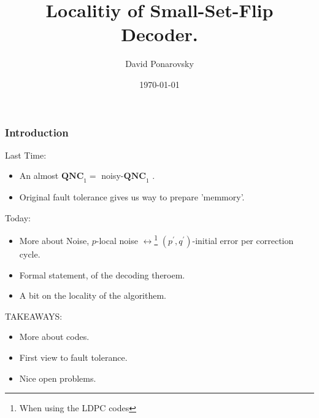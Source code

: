 \documentclass{beamer}
\newcommand*{\QNCon}{ \mathbf{QNC}_{1} }
\newcommand*{\noiseQNCon}{ noisy-$\QNCon$ }
\begin{document}
 

\newcommand*{\Tr}{\textbf{Tr }}


\begin{frame}
  \title{ Localitiy of Small-Set-Flip Decoder.  }
    \author{David Ponarovsky}
    \date{\today}
    \titlepage
\end{frame}


\begin{frame}

\frametitle{Introduction}

\begin{block}{Last Time:}
\begin{itemize}
  \item An almost  $\QNCon =$ \noiseQNCon. 
  \item Original fault tolerance gives us way to prepare 'memmory'.  
\end{itemize}
\end{block}


\begin{block}{Today:}
\begin{itemize}
  \item More about Noise, $p$-local noise $\leftrightarrow$\footnote{When using the LDPC codes} $(p^\prime, q^\prime)$-initial error per correction cycle. 
  \item  Formal statement, of the decoding theroem. 
  \item A bit on the locality of the algorithem.  
\end{itemize}
\end{block}
\begin{block}{TAKEAWAYS:}
\begin{itemize}
  \item More about codes.
  \item  First view to fault tolerance.  
  \item Nice open problems. 
\end{itemize}
\end{block}
\end{frame}
\end{document}
